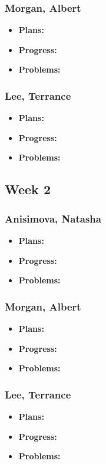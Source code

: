 \documentclass[10pt,draftclsnofoot,onecolumn]{IEEEtran}
\begin{document}
\subsubsection{Morgan, Albert}
\begin{itemize}
	\item \textbf{Plans:}
	\item \textbf{Progress:}
	\item \textbf{Problems:}
\end{itemize}
\subsubsection{Lee, Terrance}
\begin{itemize}
	\item \textbf{Plans:}
	\item \textbf{Progress:}
	\item \textbf{Problems:}
\end{itemize}
\subsection{Week 2}
\subsubsection{Anisimova, Natasha}
\begin{itemize}
	\item \textbf{Plans:}
	\item \textbf{Progress:}
	\item \textbf{Problems:}
\end{itemize}
\subsubsection{Morgan, Albert}
\begin{itemize}
	\item \textbf{Plans:}
	\item \textbf{Progress:}
	\item \textbf{Problems:}
\end{itemize}
\subsubsection{Lee, Terrance}
\begin{itemize}
	\item \textbf{Plans:}
	\item \textbf{Progress:}
	\item \textbf{Problems:}
\end{itemize}
\end{document}
